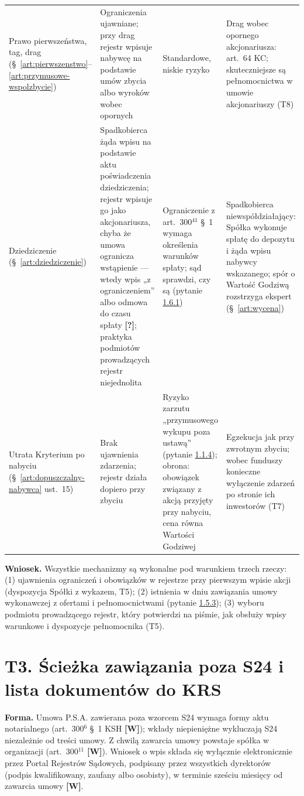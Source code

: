 \documentclass[12pt,a4paper]{report}
\newcommand{\Wiar}[1]{\textbf{[#1]}}
\begin{document}
\begin{longtable}{@{}p{2.8cm} p{3.8cm} p{3.4cm} p{4.5cm}@{}}
Prawo pierwszeństwa, tag, drag (§~\ref{art:pierwszenstwo}--\ref{art:przymusowe-wspolzbycie}) & Ograniczenia ujawniane; przy drag rejestr wpisuje nabywcę na podstawie umów zbycia albo wyroków wobec opornych & Standardowe, niskie ryzyko & Drag wobec opornego akcjonariusza: art.~64 KC; skuteczniejsze są pełnomocnictwa w umowie akcjonariuszy (T8) \\
Dziedziczenie (§~\ref{art:dziedziczenie}) & Spadkobierca żąda wpisu na podstawie aktu poświadczenia dziedziczenia; rejestr wpisuje go jako akcjonariusza, chyba że umowa ogranicza wstąpienie --- wtedy wpis „z ograniczeniem” albo odmowa do czasu spłaty \Wiar{?}; praktyka podmiotów prowadzących rejestr niejednolita & Ograniczenie z art.~300$^{41}$ §~1 wymaga określenia warunków spłaty; sąd sprawdzi, czy są (pytanie \hyperref[memo:1.6.1]{1.6.1}) & Spadkobierca niewspółdziałający: Spółka wykonuje spłatę do depozytu i żąda wpisu nabywcy wskazanego; spór o Wartość Godziwą rozstrzyga ekspert (§~\ref{art:wycena}) \\
Utrata Kryterium po nabyciu (§~\ref{art:dopuszczalny-nabywca} ust.~15) & Brak ujawnienia zdarzenia; rejestr działa dopiero przy zbyciu & Ryzyko zarzutu „przymusowego wykupu poza ustawą” (pytanie \hyperref[memo:1.1.4]{1.1.4}); obrona: obowiązek związany z akcją przyjęty przy nabyciu, cena równa Wartości Godziwej & Egzekucja jak przy zwrotnym zbyciu; wobec funduszy konieczne wyłączenie zdarzeń po stronie ich inwestorów (T7) \\
\bottomrule
\end{longtable}

\textbf{Wniosek.} Wszystkie mechanizmy są wykonalne pod warunkiem trzech rzeczy: (1) ujawnienia ograniczeń i obowiązków w rejestrze przy pierwszym wpisie akcji (dyspozycja Spółki z wykazem, T5); (2) istnienia w dniu zawiązania umowy wykonawczej z ofertami i pełnomocnictwami (pytanie \hyperref[memo:1.5.3]{1.5.3}); (3) wyboru podmiotu prowadzącego rejestr, który potwierdzi na piśmie, jak obsłuży wpisy warunkowe i dyspozycje pełnomocnika (T5).

\section*{T3. Ścieżka zawiązania poza S24 i lista dokumentów do KRS}

\textbf{Forma.} Umowa P.S.A. zawierana poza wzorcem S24 wymaga formy aktu notarialnego (art.~300$^{6}$ §~1 KSH \Wiar{W}); wkłady niepieniężne wykluczają S24 niezależnie od treści umowy. Z chwilą zawarcia umowy powstaje spółka w organizacji (art.~300$^{11}$ \Wiar{W}). Wniosek o wpis składa się wyłącznie elektronicznie przez Portal Rejestrów Sądowych, podpisany przez wszystkich dyrektorów (podpis kwalifikowany, zaufany albo osobisty), w terminie sześciu miesięcy od zawarcia umowy \Wiar{W}.
\end{document}
